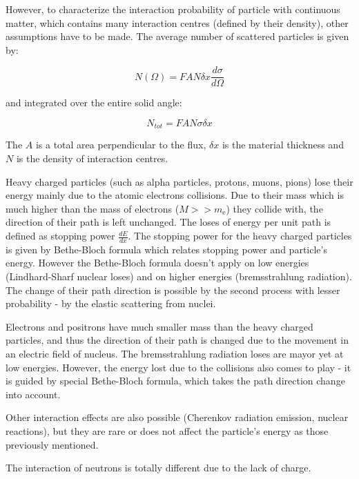 However, to characterize the interaction probability of particle with continuous matter, which contains many interaction centres (defined by their density), other assumptions have to be made. The average number of scattered particles is given by:

 \begin{equation}
 N(\Omega) = FAN \delta x \frac{d\sigma}{d\Omega}
 \end{equation}


and integrated over the entire solid angle:

 \begin{equation}
 N_{tot} = FAN\sigma \delta x 
 \end{equation}

The $A$ is a total area perpendicular to the flux, $\delta x$ is the material thickness and $N$ is the density of interaction centres.
\par 
 
Heavy charged particles (such as alpha particles, protons, muons, pions) lose their energy mainly due to the atomic electrons collisions. Due to their mass which is much higher than the mass of electrons ($M >> m_\textrm{e}$) they collide with, the direction of their path is left unchanged. The loses of energy per unit path is defined as stopping power $\frac{dE}{dx}$. The stopping power for the heavy charged particles is given by Bethe-Bloch formula which relates stopping power and particle's energy. However the Bethe-Bloch formula doesn't apply on low energies (Lindhard-Sharf nuclear loses) and on higher energies (bremsstrahlung radiation). The change of their path direction is possible by the second process with lesser probability - by the elastic scattering from nuclei.
\par
Electrons and positrons have much smaller mass than the heavy charged particles, and thus the direction of their path is changed due to the movement in an electric field of nucleus. The bremsstrahlung radiation loses are mayor yet at low energies. However, the energy lost due to the collisions also comes to play - it is guided by special Bethe-Bloch formula, which takes the path direction change into account. 
\par

Other interaction effects are also possible (Cherenkov radiation emission, nuclear reactions), but they are rare or does not affect the particle's energy as those previously mentioned.

\par
The interaction of neutrons is totally different due to the lack of charge. 

